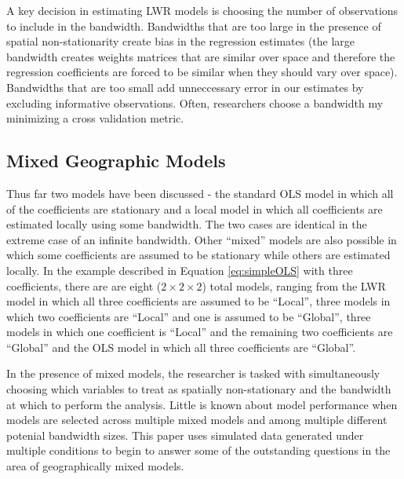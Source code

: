 \documentclass{article}\usepackage[]{graphicx}\usepackage[]{color}
\begin{document}
A key decision in estimating LWR models is choosing the number of observations to include in the bandwidth. Bandwidths that are too large in the presence of spatial non-stationarity create bias in the regression estimates (the large bandwidth creates weights matrices that are similar over space and therefore the regression coefficients are forced to be similar when they should vary over space). Bandwidths that are too small add unneccessary error in our estimates by excluding informative observations. Often, researchers choose a bandwidth my minimizing a cross validation metric. 

\subsection{Mixed Geographic Models}

Thus far two models have been discussed - the standard OLS model in which all of the coefficients are stationary and a local model in which all coefficients are estimated locally using some bandwidth. The two cases are identical in the extreme case of an infinite bandwidth. Other ``mixed'' models are also possible in which some coefficients are assumed to be stationary while others are estimated locally. In the example described in Equation \eqref{eq:simpleOLS} with three coefficients, there are are eight ($2 \times 2 \times 2$) total models, ranging from the LWR model in which all three coefficients are assumed to be ``Local'', three models in which two coefficients are ``Local'' and one is assumed to be ``Global'', three models in which one coefficient is ``Local'' and the remaining two coefficients are ``Global'' and the OLS model in which all three coefficients are ``Global''.

In the presence of mixed models, the researcher is tasked with simultaneously choosing which variables to treat as spatially non-stationary and the bandwidth at which to perform the analysis. Little is known about model performance when models are selected across multiple mixed models and among multiple different potenial bandwidth sizes. This paper uses simulated data generated under multiple conditions to begin to answer some of the outstanding questions in the area of geographically mixed models. 
\end{document}
